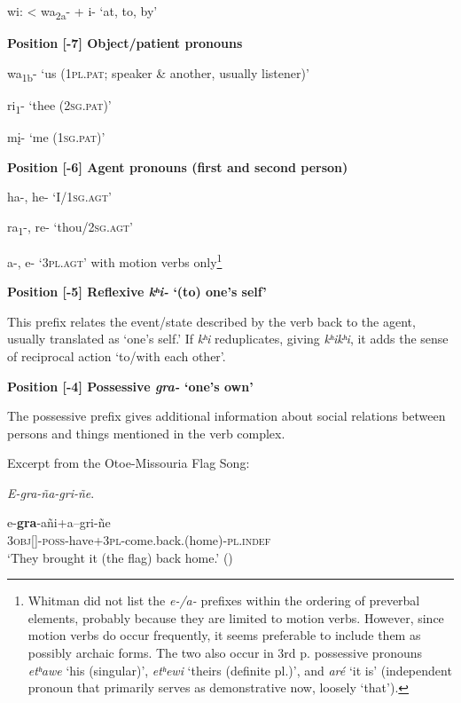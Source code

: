 \documentclass[output=paper]{LSP/langsci}
\begin{document}
\hspace{2em} wi:   < wa\textsubscript{2a}- + i-   `at, to, by'

\vspace{1em}
\textbf{Position [-7]  Object/patient pronouns}

\hspace{2em} wa\textsubscript{1b}-    `us (\textsc{1pl.pat}; speaker \& another, usually listener)' 						      	   	   

\hspace{2em} ri\textsubscript{1}-       `thee (\textsc{2sg.pat})'								   	  	   

\hspace{2em} m\k{i}-      `me (\textsc{1sg.pat})'                         

\vspace{1em}
\textbf{Position [-6]  Agent pronouns (first and second person)} 	

\hspace{2em} ha-, he-  `I/\textsc{1sg.agt}'										

\hspace{2em} ra\textsubscript{1}-, re-   `thou/\textsc{2sg.agt}'				          	    			

\hspace{2em} a-, e- `\textsc{3pl.agt}'  with motion verbs only\footnote{Whitman did not list the \textit{e-/a-} prefixes within the ordering of preverbal elements, probably because they are limited to motion verbs. However, since motion verbs do occur frequently, it seems preferable to include them as possibly archaic forms. The two also occur in 3rd p. possessive pronouns \textit{etʰawe} `his (singular)', \textit{etʰewi} `theirs (definite pl.)', and \textit{aré} `it is' (independent pronoun that primarily serves as demonstrative now, loosely `that').} 	        	        

\vspace{1em}
\textbf{Position [-5]  Reflexive \textit{kʰi-}  `(to) one's self'}		
				     		     	       
This prefix relates the event/state described by the verb back to the agent, usually translated as `one's self.' If \textit{kʰi} reduplicates, giving \textit{kʰikʰi}, it adds the sense of reciprocal action `to/with each other'.  

\vspace{1em}
\textbf{Position [-4] Possessive  \textit{gra-}  `one's own'}	
						      
The possessive prefix gives additional information about social relations between persons and things mentioned in the verb complex.				
\begin{exe}
\ex	Excerpt from the Otoe-Missouria Flag Song:  	
						           
\textit{E-gra-ña-gri-ñe}.

\gll e-\textbf{gra}-añi+a--gri-ñe \\		     
3\textsc{obj}[]-\textsc{poss}-have+3\textsc{pl}-come.back.(home)-\textsc{pl.indef} \\
\trans `They brought it (the flag) back home.' (\citealt{Greer2008})	 
\end{exe}
\end{document}
